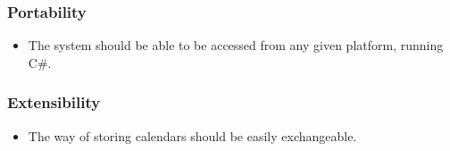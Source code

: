 \documentclass[10pt]{report}
\numberwithin{equation}{section} %
\numberwithin{figure}{section} %
\numberwithin{table}{section} %
\begin{document}
\subsubsection{Portability}
\begin{itemize}
\item The system should be able to be accessed from any given platform, running C\#.
\end{itemize}
\subsubsection{Extensibility}
\begin{itemize}
\item The way of storing calendars should be easily exchangeable.
\end{itemize}
%
%
\end{document}
